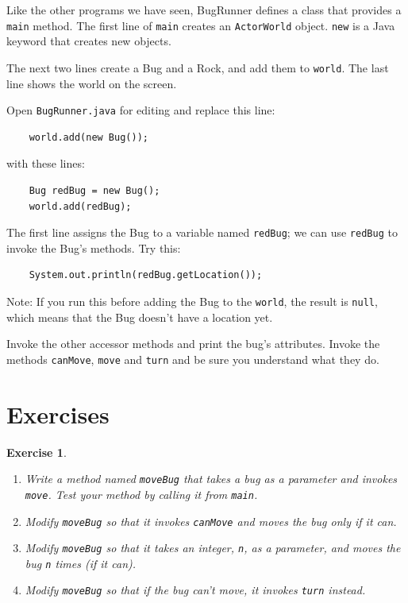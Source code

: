 \documentclass[12pt]{book}
\theoremstyle{exercise}
\newtheorem{exercise}{Exercise}[chapter]
\begin{document}
Like the other programs we have seen, BugRunner defines a class
that provides a {\tt main} method.  The first line of {\tt main}
creates an {\tt ActorWorld} object.  {\tt new} is a Java keyword
that creates new objects.

The next two lines create a Bug and a Rock, and add them to {\tt world}.
The last line shows the world on the screen.

Open {\tt BugRunner.java} for editing and replace this line:

\begin{lstlisting}
    world.add(new Bug());
\end{lstlisting}

with these lines:

\begin{lstlisting}
    Bug redBug = new Bug();
    world.add(redBug);
\end{lstlisting}

The first line assigns the Bug to a variable named {\tt redBug};
we can use {\tt redBug} to invoke the Bug's methods.  Try this:

\begin{lstlisting}
    System.out.println(redBug.getLocation());
\end{lstlisting}

Note: If you run this before adding the Bug to the {\tt world}, the result is
{\tt null}, which means that the Bug doesn't have a location yet.

Invoke the other accessor methods and print the bug's attributes.
Invoke the methods {\tt canMove}, {\tt move} and {\tt turn} and
be sure you understand what they do.  %


\section{Exercises}

\begin{exercise}

\begin{enumerate}

\item Write a method named {\tt moveBug} that takes a bug as a parameter
and invokes {\tt move}.  Test your method by calling it from {\tt main}.

\item Modify {\tt moveBug} so that it invokes {\tt canMove} and moves
the bug only if it can.

\item Modify {\tt moveBug} so that it takes an integer, {\tt n}, as a
parameter, and moves the bug {\tt n} times (if it can).

\item Modify {\tt moveBug} so that if the bug can't move, it invokes
{\tt turn} instead.

\end{enumerate}
\end{exercise}
\end{document}
